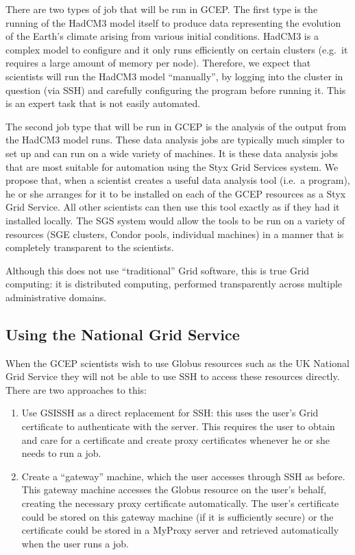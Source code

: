 \documentclass[a4paper]{article}
\begin{document}
\begin{multicols}{2}
There are two types of job that will be run in GCEP.  The first type is the running of the HadCM3 model itself to produce data representing the evolution of the Earth's climate arising from various initial conditions.  HadCM3 is a complex model to configure and it only runs efficiently on certain clusters (e.g.\ it requires a large amount of memory per node).  Therefore, we expect that scientists will run the HadCM3 model ``manually'', by logging into the cluster in question (via SSH) and carefully configuring the program before running it.  This is an expert task that is not easily automated.

The second job type that will be run in GCEP is the analysis of the output from the HadCM3 model runs.  These data analysis jobs are typically much simpler to set up and can run on a wide variety of machines.  It is these data analysis jobs that are most suitable for automation using the Styx Grid Services system.  We propose that, when a scientist creates a useful data analysis tool (i.e.\ a program), he or she arranges for it to be installed on each of the GCEP resources as a Styx Grid Service.  All other scientists can then use this tool exactly as if they had it installed locally.  The SGS system would allow the tools to be run on a variety of resources (SGE clusters, Condor pools, individual machines) in a manner that is completely transparent to the scientists.

Although this does not use ``traditional'' Grid software, this is true Grid computing: it is distributed computing, performed transparently across multiple administrative domains.

\subsection{Using the National Grid Service}
When the GCEP scientists wish to use Globus resources such as the UK National Grid Service they will not be able to use SSH to access these resources directly.  There are two approaches to this:

\begin{enumerate}
\item Use GSISSH as a direct replacement for SSH: this uses the user's Grid certificate to authenticate with the server.  This requires the user to obtain and care for a certificate and create proxy certificates whenever he or she needs to run a job.
\item Create a ``gateway'' machine, which the user accesses through SSH as before. This gateway machine accesses the Globus resource on the user's behalf, creating the necessary proxy certificate automatically.  The user's certificate could be stored on this gateway machine (if it is sufficiently secure) or the certificate could be stored in a MyProxy server and retrieved automatically when the user runs a job.
\end{enumerate}


\end{multicols}
\end{document}
